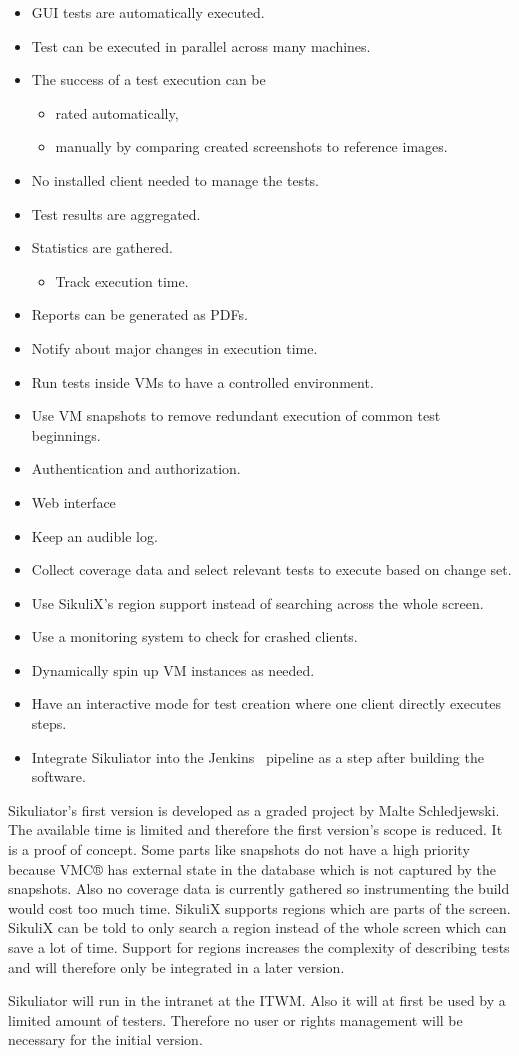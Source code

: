 \documentclass[a4paper,twocolumn,twoside]{article}
\newcommand{\VMC}[0]{VMC®}
\newcommand{\Sik}[0]{Sikuliator}
\newcommand{\notImplemented}[0]{\item[$\times$] }
\newcommand{\partiallyImplemented}[0]{\item[$\boxdot$] }
\newcommand{\implemented}[0]{\item[\checkmark] }
\begin{document}
\begin{itemize}
	\implemented GUI tests are automatically executed.
	\implemented Test can be executed in parallel across many machines.
	\partiallyImplemented The success of a test execution can be
	\begin{itemize}
		\implemented rated automatically,
		\notImplemented manually by comparing created screenshots to reference images.
	\end{itemize}
	\implemented No installed client needed to manage the tests.
	\implemented Test results are aggregated.
	\notImplemented Statistics are gathered.
	\begin{itemize}
		\notImplemented Track execution time.
	\end{itemize}
	\notImplemented Reports can be generated as PDFs.
	\notImplemented Notify about major changes in execution time.
	\implemented Run tests inside VMs to have a controlled environment.
	\notImplemented Use VM snapshots to remove redundant execution of common test beginnings.
	\notImplemented Authentication and authorization.
	\partiallyImplemented Web interface
	\notImplemented Keep an audible log.
	\notImplemented Collect coverage data and select relevant tests to execute based on change set.
	\notImplemented Use SikuliX's region support instead of searching across the whole screen.
	\notImplemented Use a monitoring system to check for crashed clients.
	\notImplemented Dynamically spin up VM instances as needed.
	\notImplemented Have an interactive mode for test creation where one client directly executes steps.
	\notImplemented Integrate \Sik{} into the Jenkins~\cite{Jenkins} pipeline as a step after building the software.
\end{itemize}

\Sik{}'s first version is developed as a graded project by Malte Schledjewski.
The available time is limited and therefore the first version's scope is reduced.
It is a proof of concept.
Some parts like snapshots do not have a high priority because \VMC{} has external state in the database which is not captured by the snapshots. 
Also no coverage data is currently gathered so instrumenting the build would cost too much time. 
SikuliX supports regions which are parts of the screen.
SikuliX can be told to only search a region instead of the whole screen which can save a lot of time. 
Support for regions increases the complexity of describing tests and will therefore only be integrated in a later version.

\Sik{} will run in the intranet at the ITWM.
Also it will at first be used by a limited amount of testers.
Therefore no user or rights management will be necessary for the initial version.
\end{document}
